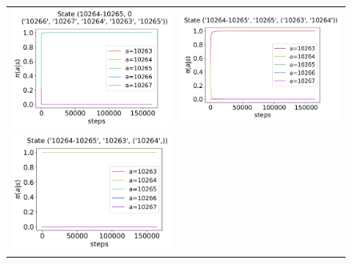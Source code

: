 \begin{figure}[!htp]
    \centering
    \begin{tabular}{cc}
        \includegraphics[scale=0.36,valign=b]{chapters/figures/policy_PG_state_0.png} &
        \includegraphics[scale=0.36,valign=b]{chapters/figures/policy_PG_state_1.png} \\
        \hspace*{-5pt}\includegraphics[scale=0.36,valign=b]{chapters/figures/policy_PG_state_2.png} &

\end{tabular}
\end{figure}
